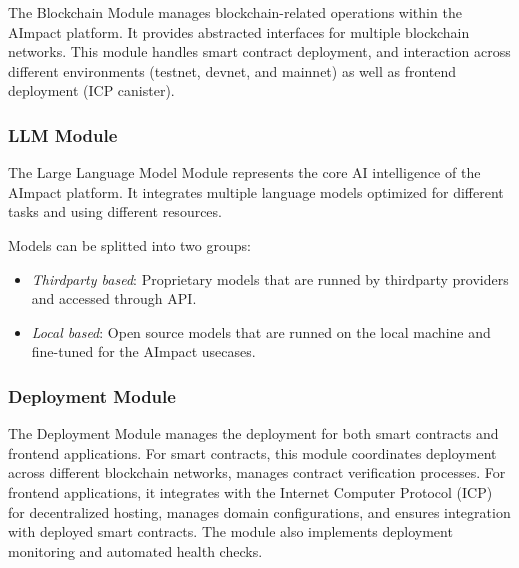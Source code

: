 \documentclass[12pt,a4paper]{article}
\begin{document}
The Blockchain Module manages blockchain-related operations within the AImpact platform. 
It provides abstracted interfaces for multiple blockchain networks. 
This module handles smart contract deployment, and interaction across different environments (testnet, devnet, and mainnet) 
as well as frontend deployment (ICP canister). 


\subsubsection{LLM Module}

The Large Language Model Module represents the core AI intelligence of the AImpact platform. 
It integrates multiple language models optimized for different tasks and using different resources. 

Models can be splitted into two groups:
\begin{itemize}
    \item \textit{Thirdparty based}: Proprietary models that are runned by thirdparty providers and accessed through API.
    \item \textit{Local based}: Open source models that are runned on the local machine and fine-tuned for the AImpact usecases.
\end{itemize}



\subsubsection{Deployment Module}

The Deployment Module manages the deployment for both smart contracts and frontend applications. 
For smart contracts, this module coordinates deployment across different blockchain networks, manages contract verification processes. 
For frontend applications, it integrates with the Internet Computer Protocol (ICP) for decentralized hosting, 
manages domain configurations, and ensures integration with deployed smart contracts. 
The module also implements deployment monitoring and automated health checks.



\end{document}
